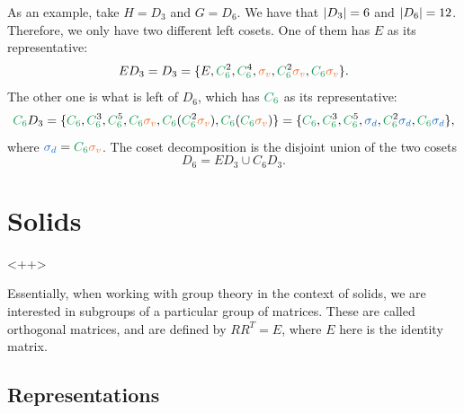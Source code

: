 As an example, take $H = D_3$ and $G = D_6$. We have that $\abs{D_3}=6$ and $\abs{D_6} = 12$. Therefore, we only have two different left cosets. One of them has $E$ as its representative:
$$
E D_3 = D_3 = \{E, \textcolor{ForestGreen}{C_6^{\textcolor{black}{2}}}, \textcolor{ForestGreen}{C_6^{\textcolor{black}{4}}}, \textcolor{Orange}{\sigma_v}, \textcolor{ForestGreen}{C_6^{\textcolor{black}{2}}} \textcolor{Orange}{\sigma_v}, \textcolor{ForestGreen}{C_6} \textcolor{Orange}{\sigma_v} \}.
$$
The other one is what is left of $D_6$, which has $\textcolor{ForestGreen}{C_6}$ as its representative:
$$
\textcolor{ForestGreen}{C_6} D_3 = \{\textcolor{ForestGreen}{C_6}, \textcolor{ForestGreen}{C_6^{\textcolor{black}{3}}}, \textcolor{ForestGreen}{C_6^{\textcolor{black}{5}}}, \textcolor{ForestGreen}{C_6}\textcolor{Orange}{\sigma_v}, \textcolor{ForestGreen}{C_6} (\textcolor{ForestGreen}{C_6^{\textcolor{black}{2}}} \textcolor{Orange}{\sigma_v}), \textcolor{ForestGreen}{C_6}(\textcolor{ForestGreen}{C_6} \textcolor{Orange}{\sigma_v}) \} = \{ \textcolor{ForestGreen}{C_6}, \textcolor{ForestGreen}{C_6^{\textcolor{black}{3}}}, \textcolor{ForestGreen}{C_6^{\textcolor{black}{5}}}, \textcolor{RoyalBlue}{\sigma_d}, \textcolor{ForestGreen}{C_6^{\textcolor{black}{2}}} \textcolor{RoyalBlue}{\sigma_d}, \textcolor{ForestGreen}{C_6} \textcolor{RoyalBlue}{\sigma_d} \},
$$
where $\textcolor{RoyalBlue}{\sigma_d} = \textcolor{ForestGreen}{C_6}\textcolor{Orange}{\sigma_v}$. The coset decomposition is the disjoint union of the two cosets
$$
D_6 = ED_3 \cup C_6 D_3.
$$

\section{Solids}

<++>

\n

Essentially, when working with group theory in the context of solids, we are interested in subgroups of a particular group of matrices. These are called orthogonal matrices, and are defined by $R R^T = E$, where $E$ here is the identity matrix.

\n\n\n


\subsection{Representations}

